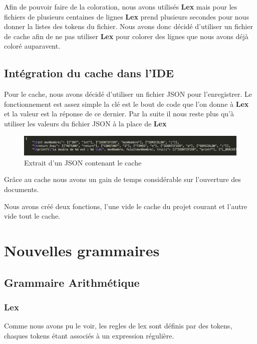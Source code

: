 \documentclass[a4paper,12pt]{article}
\begin{document}
		Afin de pouvoir faire de la coloration, nous avons utilisés \textbf{Lex} mais pour les fichiers de plusieurs centaines de lignes \textbf{Lex} prend plusieurs secondes pour nous donner la listes des tokens du fichier. Nous avons donc décidé d'utiliser un fichier de cache afin de ne pas utiliser \textbf{Lex} pour colorer des lignes que nous avons déjà coloré auparavent.

	\subsection{Intégration du cache dans l'IDE}

		Pour le cache, nous avons décidé d'utiliser un fichier JSON pour l'enregistrer. Le fonctionnement est assez simple la clé est le bout de code que l'on donne à \textbf{Lex} et la valeur est la réponse de ce dernier. Par la suite il nous reste plus qu'à utiliser les valeurs du fichier JSON à la place de \textbf{Lex}

			\begin{figure}[h!]
				\begin{center}
					\includegraphics[scale=0.5]{images/exempleJsonCache}
					\caption{Extrait d'un JSON contenant le cache}
				\end{center}
			\end{figure}

		Grâce au cache nous avons un gain de temps considérable sur l'ouverture des documents.
		
		Nous avons créé deux fonctions, l'une vide le cache du projet courant et l'autre vide tout le cache. 

\section{Nouvelles grammaires}

	\subsection{Grammaire Arithmétique}

		\subsubsection{Lex}
			
			Comme nous avons pu le voir, les regles de lex sont définis par des tokens, chaques tokens étant associés à un expression régulière. 
\end{document}
